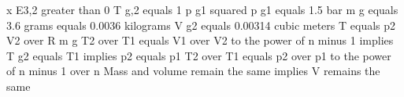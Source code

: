 x E3,2 greater than 0
T g,2 equals 1 p g1 squared
p g1 equals 1.5 bar
m g equals 3.6 grams equals 0.0036 kilograms
V g2 equals 0.00314 cubic meters
T equals p2 V2 over R m g
T2 over T1 equals V1 over V2 to the power of n minus 1
implies T g2 equals T1
implies p2 equals p1
T2 over T1 equals p2 over p1 to the power of n minus 1 over n
Mass and volume remain the same implies V remains the same